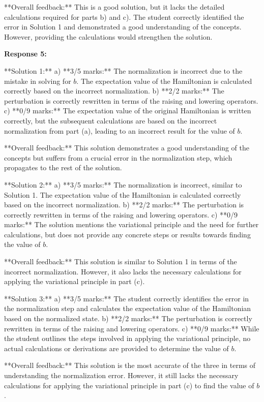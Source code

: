 \documentclass[a4paper,11pt]{article}
\begin{document}
**Overall feedback:** This is a good solution, but it lacks the detailed calculations required for parts b) and c). The student correctly identified the error in Solution 1 and demonstrated a good understanding of the concepts. However, providing the calculations would strengthen the solution.


\textbf{Response 5:}

**Solution 1:**
a) **3/5 marks:** The normalization is incorrect due to the mistake in solving for \(b\). The expectation value of the Hamiltonian is calculated correctly based on the incorrect normalization.
b) **2/2 marks:** The perturbation is correctly rewritten in terms of the raising and lowering operators.
c) **0/9 marks:** The expectation value of the original Hamiltonian is written correctly, but the subsequent calculations are based on the incorrect normalization from part (a), leading to an incorrect result for the value of \(b\).

**Overall feedback:** This solution demonstrates a good understanding of the concepts but suffers from a crucial error in the normalization step, which propagates to the rest of the solution.

**Solution 2:**
a) **3/5 marks:** The normalization is incorrect, similar to Solution 1. The expectation value of the Hamiltonian is calculated correctly based on the incorrect normalization.
b) **2/2 marks:** The perturbation is correctly rewritten in terms of the raising and lowering operators.
c) **0/9 marks:** The solution mentions the variational principle and the need for further calculations, but does not provide any concrete steps or results towards finding the value of \(b\).

**Overall feedback:** This solution is similar to Solution 1 in terms of the incorrect normalization. However, it also lacks the necessary calculations for applying the variational principle in part (c).

**Solution 3:**
a) **3/5 marks:** The student correctly identifies the error in the normalization step and calculates the expectation value of the Hamiltonian based on the normalized state.
b) **2/2 marks:** The perturbation is correctly rewritten in terms of the raising and lowering operators.
c) **0/9 marks:** While the student outlines the steps involved in applying the variational principle, no actual calculations or derivations are provided to determine the value of \(b\).

**Overall feedback:** This solution is the most accurate of the three in terms of understanding the normalization error. However, it still lacks the necessary calculations for applying the variational principle in part (c) to find the value of \(b\).
\end{document}
